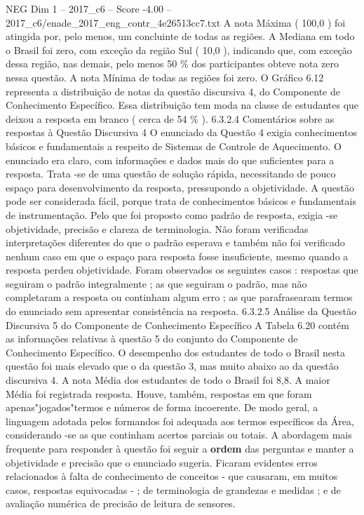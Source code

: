 \begin{textsample}{NEG Dim 1 – 2017\_c6 – Score -4.00 – 2017\_c6/enade\_2017\_eng\_contr\_4e26513cc7.txt}
A nota Máxima ( 100,0 ) foi atingida por, pelo menos, um concluinte de todas as regiões.
A Mediana em todo o Brasil foi zero, com exceção da região Sul ( 10,0 ), indicando que, com exceção dessa região, nas demais, pelo menos 50 \% dos participantes obteve nota zero nessa questão.
A nota Mínima de todas as regiões foi zero.
O Gráfico 6.12 representa a distribuição de notas da questão discursiva 4, do Componente de Conhecimento Específico.
Essa distribuição tem moda na classe de estudantes que deixou a resposta em branco ( cerca de 54 \% ). 6.3.2.4 Comentários sobre as respostas à Questão Discursiva 4 O enunciado da Questão 4 exigia conhecimentos básicos e fundamentais a respeito de Sistemas de Controle de Aquecimento.
O enunciado era claro, com informações e dados mais do que suficientes para a resposta.
Trata -se de uma questão de solução rápida, necessitando de pouco espaço para desenvolvimento da resposta, pressupondo a objetividade.
A questão pode ser considerada fácil, porque trata de conhecimentos básicos e fundamentais de instrumentação.
Pelo que foi proposto como padrão de resposta, exigia -se objetividade, precisão e clareza de terminologia.
Não foram verificadas interpretações diferentes do que o padrão esperava e também não foi verificado nenhum caso em que o espaço para resposta fosse insuficiente, mesmo quando a resposta perdeu objetividade.
Foram observados os seguintes casos : respostas que seguiram o padrão integralmente ; as que seguiram o padrão, mas não completaram a resposta ou continham algum erro ; as que parafrasearam termos do enunciado sem apresentar consistência na resposta. 6.3.2.5 Análise da Questão Discursiva 5 do Componente de Conhecimento Específico A Tabela 6.20 contém as informações relativas à questão 5 do conjunto do Componente de Conhecimento Específico.
O desempenho dos estudantes de todo o Brasil nesta questão foi mais elevado que o da questão 3, mas muito abaixo ao da questão discursiva 4.
A nota Média dos estudantes de todo o Brasil foi 8,8.
A maior Média foi registrada resposta.
Houve, também, respostas em que foram apenas"jogados"termos e números de forma incoerente.
De modo geral, a linguagem adotada pelos formandos foi adequada aos termos específicos da Área, considerando -se as que continham acertos parciais ou totais.
A abordagem mais frequente para responder à questão foi seguir a \textbf{ordem} das perguntas e manter a objetividade e precisão que o enunciado sugeria.
Ficaram evidentes erros relacionados à falta de conhecimento de conceitos - que causaram, em muitos casos, respostas equivocadas - ; de terminologia de grandezas e medidas ; e de avaliação numérica de precisão de leitura de sensores.

\end{textsample}
